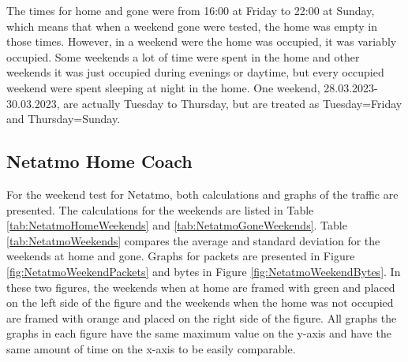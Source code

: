 The times for home and gone were from 16:00 at Friday to 22:00 at Sunday, which means that when a weekend gone were tested, the home was empty in those times. However, in a weekend were the home was occupied, it was variably occupied. Some weekends a lot of time were spent in the home and other weekends it was just occupied during evenings or daytime, but every occupied weekend were spent sleeping at night in the home. One weekend, 28.03.2023-30.03.2023, are actually Tuesday to Thursday, but are treated as Tuesday=Friday and Thursday=Sunday. 
\newpage
\subsection{Netatmo Home Coach}
For the weekend test for Netatmo, both calculations and graphs of the traffic are presented. The calculations for the weekends are listed in Table \ref{tab:NetatmoHomeWeekends} and \ref{tab:NetatmoGoneWeekends}. Table \ref{tab:NetatmoWeekends} compares the average and standard deviation for the weekends at home and gone. Graphs for packets are presented in Figure \ref{fig:NetatmoWeekendPackets} and bytes in Figure \ref{fig:NetatmoWeekendBytes}. In these two figures, the weekends when at home are framed with green and placed on the left side of the figure and the weekends when the home was not occupied are framed with orange and placed on the right side of the figure. All graphs the graphs in each figure have the same maximum value on the y-axis and have the same amount of time on the x-axis to be easily comparable. 

